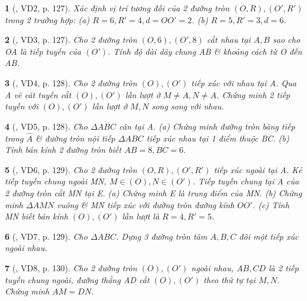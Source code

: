 \documentclass{article}
\newtheorem{baitoan}{}
\begin{document}
\begin{baitoan}[\cite{Binh_boi_duong_Toan_9_tap_1}, VD2, p. 127]
	Xác định vị trí tương đối của 2 đường tròn $(O,R),(O',R')$ trong 2 trường hợp: (a) $R = 6,R' = 4,d = OO' = 2$. (b) $R = 5,R' = 3,d = 6$.
\end{baitoan}

\begin{baitoan}[\cite{Binh_boi_duong_Toan_9_tap_1}, VD3, p. 127]
	Cho 2 đường tròn $(O,6),(O',8)$ cắt nhau tại $A,B$ sao cho OA là tiếp tuyến của $(O')$. Tính độ dài dây chung AB \& khoảng cách từ O đến AB.
\end{baitoan}

\begin{baitoan}[\cite{Binh_boi_duong_Toan_9_tap_1}, VD4, p. 128]
	 Cho 2 đường tròn $(O),(O')$ tiếp xúc với nhau tại A. Qua A vẽ cát tuyến cắt $(O),(O')$ lần lượt ở $M\ne A,N\ne A$. Chứng minh 2 tiếp tuyến với $(O),(O')$ lần lượt ở $M,N$ song song với nhau.
\end{baitoan}

\begin{baitoan}[\cite{Binh_boi_duong_Toan_9_tap_1}, VD5, p. 128]
	Cho $\Delta ABC$ cân tại A. (a) Chứng minh đường tròn bàng tiếp trong $\widehat{A}$ \& đường tròn nội tiếp $\Delta ABC$ tiếp xúc nhau tại 1 điểm thuộc BC. (b) Tính bán kính 2 đường tròn biết $AB = 8,BC = 6$.
\end{baitoan}

\begin{baitoan}[\cite{Binh_boi_duong_Toan_9_tap_1}, VD6, p. 129]
	Cho 2 đường tròn $(O,R),(O',R')$ tiếp xúc ngoài tại A. Kẻ tiếp tuyến chung ngoài MN, $M\in(O),N\in(O')$. Tiếp tuyến chung tại A của 2 đường tròn cắt MN tại E. (a) Chứng minh E là trung điểm của MN. (b) Chứng minh $\Delta AMN$ vuông \& MN tiếp xúc với đường tròn đường kính $OO'$. (c) Tính MN biết bán kính $(O),(O')$ lần lượt là $R = 4,R' = 5$.
\end{baitoan}

\begin{baitoan}[\cite{Binh_boi_duong_Toan_9_tap_1}, VD7, p. 129]
	Cho $\Delta ABC$. Dựng 3 đường tròn tâm $A,B,C$ đôi một tiếp xúc ngoài nhau.
\end{baitoan}

\begin{baitoan}[\cite{Binh_boi_duong_Toan_9_tap_1}, VD8, p. 130]
	Cho 2 đường tròn $(O),(O')$ ngoài nhau, $AB,CD$ là 2 tiếp tuyến chung ngoài, đường thẳng AD cắt $(O),(O')$ theo thứ tự tại $M,N$. Chứng minh $AM = DN$.
\end{baitoan}
\end{document}
